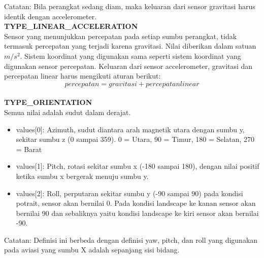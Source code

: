 Catatan: Bila perangkat sedang diam, maka keluaran dari sensor gravitasi harus identik dengan accelerometer. \\
\textbf{TYPE\_LINEAR\_ACCELERATION}\\
Sensor yang menunjukkan percepatan pada setiap sumbu perangkat, tidak termasuk percepatan yang terjadi karena gravitasi. Nilai diberikan dalam satuan \(m/s^2\). Sistem koordinat yang digunakan sama seperti sistem koordinat yang digunakan sensor percepatan. Keluaran dari sensor accelerometer, gravitasi dan percepatan linear harus mengikuti aturan berikut:
\[
	percepatan = gravitasi + percepatan linear
\]\\
\textbf{TYPE\_ORIENTATION}\\
Semua nilai adalah sudut dalam derajat.
\begin{itemize}
	\item values[0]: Azimuth, sudut diantara arah magnetik utara dengan sumbu y, sekitar sumbu z (0 sampai 359). 0 = Utara, 90 = Timur, 180 = Selatan, 270 = Barat
	\item values[1]: Pitch, rotasi sekitar sumbu x (-180 sampai 180), dengan nilai positif ketika sumbu x bergerak menuju sumbu y.
	\item values[2]: Roll, perputaran sekitar sumbu y (-90 sampai 90) pada kondisi potrait, sensor akan bernilai 0. Pada kondisi landscape ke kanan sensor akan bernilai 90 dan sebaliknya yaitu kondisi landscape ke kiri sensor akan bernilai -90.
\end{itemize}

Catatan: Definisi ini berbeda dengan definisi yaw, pitch, dan roll yang digunakan pada aviasi yang sumbu X adalah sepanjang sisi bidang.

